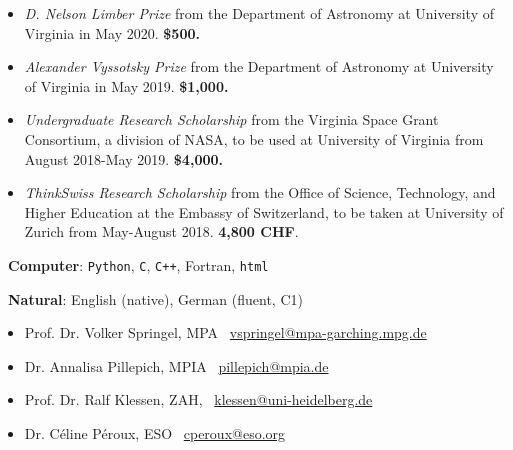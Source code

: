 \documentclass[a4paper,12pt,oneside]{article}
\begin{document}
\noindent{}

\begin{itemize}[wide, labelwidth=!, labelindent=-11pt, noitemsep]
    \item {\it D. Nelson Limber Prize} from the Department of Astronomy at University of Virginia in May 2020. {\bf \$500.}
    \item {\it Alexander Vyssotsky Prize} from the Department of Astronomy at University of Virginia in May 2019. {\bf \$1,000.}
    \item {\it Undergraduate Research Scholarship} from the Virginia Space Grant Consortium, a division of NASA, to be used at University of Virginia from August 2018-May 2019. {\bf \$4,000.} 
    \item {\it ThinkSwiss Research Scholarship} from the Office of Science, Technology, and Higher Education at the Embassy of Switzerland, to be taken at University of Zurich from May-August 2018. {\bf 4,800 CHF}.
\end{itemize}


\noindent{}

\vspace{5.5pt}

\noindent \hspace{-19pt} \faKeyboardO\ {\bf Computer}: \texttt{Python}, \texttt{C}, \texttt{C++}, Fortran, \texttt{html}

\vspace{5.5pt}

\noindent \hspace{-17pt} \faLanguage\ {\bf Natural}: English (native), German (fluent, C1) \\

\noindent{}
\begin{itemize}[wide, labelwidth=!, labelindent=-11pt, parsep=0pt, noitemsep]
    \item Prof. Dr. Volker Springel, MPA \faEnvelope~\href{mailto:vspringel@MPA-Garching.MPG.DE}{vspringel@mpa-garching.mpg.de}
    \item Dr. Annalisa Pillepich, MPIA \faEnvelope~\href{mailto:pillepich@mpia.de}{pillepich@mpia.de}
    \item Prof. Dr. Ralf Klessen, ZAH, \faEnvelope~\href{mailto:klessen@uni-heidelberg.de}{klessen@uni-heidelberg.de}
    \item Dr. C\'eline P\'eroux, ESO \faEnvelope~\href{mailto:cperoux@eso.org}{cperoux@eso.org}
    \end{itemize}
    
    \vspace{5.5pt}
\end{document}
